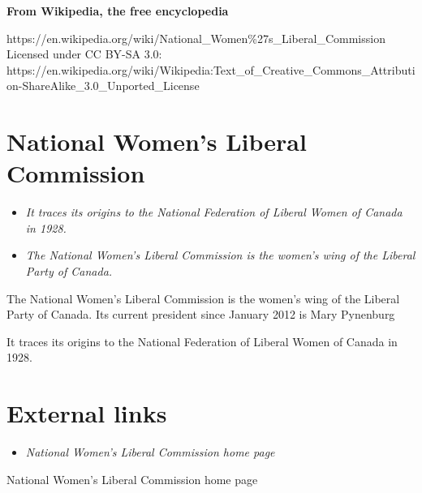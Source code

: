 \textbf{From Wikipedia, the free encyclopedia}

https://en.wikipedia.org/wiki/National\_Women\%27s\_Liberal\_Commission\\
Licensed under CC BY-SA 3.0:\\
https://en.wikipedia.org/wiki/Wikipedia:Text\_of\_Creative\_Commons\_Attribution-ShareAlike\_3.0\_Unported\_License

\section{National Women's Liberal
Commission}\label{national-womens-liberal-commission}

\begin{itemize}
\item
  \emph{It traces its origins to the National Federation of Liberal
  Women of Canada in 1928.}
\item
  \emph{The National Women's Liberal Commission is the women's wing of
  the Liberal Party of Canada.}
\end{itemize}

The National Women's Liberal Commission is the women's wing of the
Liberal Party of Canada. Its current president since January 2012 is
Mary Pynenburg

It traces its origins to the National Federation of Liberal Women of
Canada in 1928.

\section{External links}\label{external-links}

\begin{itemize}
\item
  \emph{National Women's Liberal Commission home page}
\end{itemize}

National Women's Liberal Commission home page
